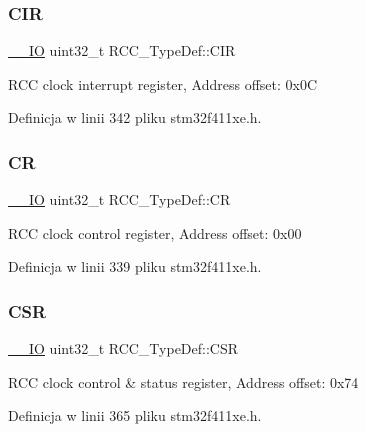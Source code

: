 \subsubsection{\texorpdfstring{C\+IR}{CIR}}
{\footnotesize\ttfamily \hyperlink{core__sc300_8h_aec43007d9998a0a0e01faede4133d6be}{\+\_\+\+\_\+\+IO} uint32\+\_\+t R\+C\+C\+\_\+\+Type\+Def\+::\+C\+IR}

R\+CC clock interrupt register, Address offset\+: 0x0C 

Definicja w linii 342 pliku stm32f411xe.\+h.

\mbox{\label{struct_r_c_c___type_def_abcb9ff48b9afb990283fefad0554b5b3}} 
\subsubsection{\texorpdfstring{CR}{CR}}
{\footnotesize\ttfamily \hyperlink{core__sc300_8h_aec43007d9998a0a0e01faede4133d6be}{\+\_\+\+\_\+\+IO} uint32\+\_\+t R\+C\+C\+\_\+\+Type\+Def\+::\+CR}

R\+CC clock control register, Address offset\+: 0x00 

Definicja w linii 339 pliku stm32f411xe.\+h.

\mbox{\label{struct_r_c_c___type_def_a7e913b8bf59d4351e1f3d19387bd05b9}} 
\subsubsection{\texorpdfstring{C\+SR}{CSR}}
{\footnotesize\ttfamily \hyperlink{core__sc300_8h_aec43007d9998a0a0e01faede4133d6be}{\+\_\+\+\_\+\+IO} uint32\+\_\+t R\+C\+C\+\_\+\+Type\+Def\+::\+C\+SR}

R\+CC clock control \& status register, Address offset\+: 0x74 

Definicja w linii 365 pliku stm32f411xe.\+h.

\mbox{\label{struct_r_c_c___type_def_a877ad70fcd4a215bc8f9bb31fdc8d3d1}} 
